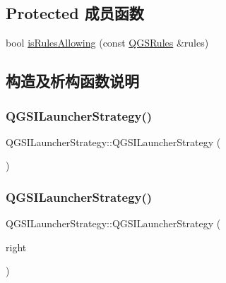\subsection*{Protected 成员函数}
\begin{DoxyCompactItemize}
\item 
bool \mbox{\hyperlink{class_q_g_s_i_launcher_strategy_aa443633178590a1831e9867e8345488e}{is\+Rules\+Allowing}} (const \mbox{\hyperlink{class_q_g_s_rules}{Q\+G\+S\+Rules}} \&rules)
\end{DoxyCompactItemize}


\subsection{构造及析构函数说明}
\mbox{\label{class_q_g_s_i_launcher_strategy_aa45a8d5ff2c02ebefe418beb8183ad3e}} 
\subsubsection{\texorpdfstring{Q\+G\+S\+I\+Launcher\+Strategy()}{QGSILauncherStrategy()}\hspace{0.1cm}{\footnotesize\ttfamily [1/3]}}
{\footnotesize\ttfamily Q\+G\+S\+I\+Launcher\+Strategy\+::\+Q\+G\+S\+I\+Launcher\+Strategy (\begin{DoxyParamCaption}{ }\end{DoxyParamCaption})}

\mbox{\label{class_q_g_s_i_launcher_strategy_a864252fe899cfe21b97218a89ca188b3}} 
\subsubsection{\texorpdfstring{Q\+G\+S\+I\+Launcher\+Strategy()}{QGSILauncherStrategy()}\hspace{0.1cm}{\footnotesize\ttfamily [2/3]}}
{\footnotesize\ttfamily Q\+G\+S\+I\+Launcher\+Strategy\+::\+Q\+G\+S\+I\+Launcher\+Strategy (\begin{DoxyParamCaption}\item[{const \mbox{\hyperlink{class_q_g_s_i_launcher_strategy}{Q\+G\+S\+I\+Launcher\+Strategy}} \&}]{right }\end{DoxyParamCaption})\hspace{0.3cm}{\ttfamily [delete]}}


